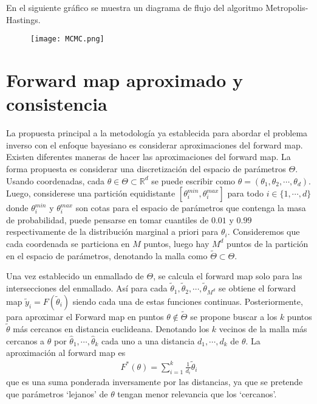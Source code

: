 En el siguiente gráfico se muestra un diagrama de flujo del algoritmo Metropolis-Hastings.

\begin{figure}[H] 
    \centering 
    \texttt{[image: MCMC.png]} 
    \label{Fig. }
\end{figure} 


\section{Forward map aproximado y consistencia}


La propuesta principal a la metodología ya establecida para abordar el problema inverso con el enfoque bayesiano es considerar aproximaciones del forward map. Existen diferentes maneras de hacer las aproximaciones del forward map. La forma propuesta es considerar una discretización del espacio de parámetros $\Theta$. Usando coordenadas, cada $\theta \in \Theta \subset \mathbb{R}^d$ se puede escribir como $\theta = (\theta_1, \theta_2, \cdots, \theta_d)$. Luego, considerese una partición equidistante $[\theta_i^{min},\theta_i^{max}]$ para todo $i \in \{1,\cdots,d\}$ donde $\theta_i^{min}$ y $\theta_i^{max}$ son cotas para el espacio de parámetros que contenga la masa de probabilidad, puede pensarse en tomar cuantiles de $0.01$ y $0.99$ respectivamente de la distribución marginal a priori para $\theta_i$. Consideremos que cada coordenada se particiona en $M$ puntos, luego hay $M^d$ puntos de la partición en el espacio de parámetros, denotando la malla como $\tilde{\Theta}\subset \Theta$.

Una vez establecido un enmallado de $\Theta$, se calcula el forward map solo para las intersecciones del enmallado. Así para cada $\tilde{\theta}_1, \tilde{\theta}_2, \cdots, \tilde{\theta}_{M^d}$ se obtiene el forward map $\tilde{y}_i = F(\tilde{\theta}_i)$ siendo cada una de estas funciones continuas. Posteriormente, para aproximar el Forward map en puntos $\theta \not\in \tilde{\Theta}$ se propone buscar a los $k$ puntos $\tilde{\theta}$ más cercanos en distancia euclideana. Denotando los $k$ vecinos de la malla más cercanos a $\theta$ por $\hat{\theta}_1, \cdots, \hat{\theta}_k$ cada uno a una distancia $d_1, \cdots, d_k$ de $\theta$. La aproximación al forward map es
\begin{align}
    F^{*}(\theta) = \sum_{i = 1}^{k} \frac{1}{d_i} \tilde{\theta}_i
\end{align}
que es una suma ponderada inversamente por las distancias, ya que se pretende que parámetros `lejanos' de $\theta$ tengan menor relevancia que los `cercanos'. 

